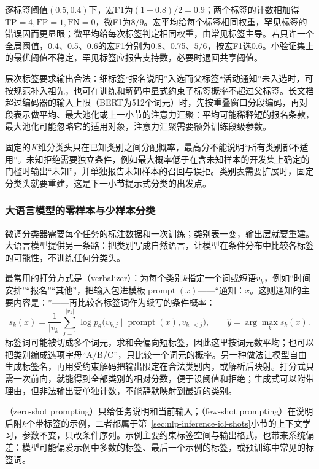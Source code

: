 逐标签阈值$(0.5,0.4)$下，宏F1为$(1+0.8)/2=0.9$；两个标签的计数相加得$\mathrm{TP}=4,\mathrm{FP}=1,\mathrm{FN}=0$，微F1为$8/9$。宏平均给每个标签相同权重，罕见标签的错误因而更显眼；微平均给每次标签判定相同权重，由常见标签主导。若只许一个全局阈值，0.4、0.5、0.6的宏F1分别为0.8、0.75、$5/6$，按宏F1选0.6。小验证集上的最优阈值不稳定，罕见标签应报告支持数，必要时退回共享阈值。

层次标签要求输出合法：细标签“报名说明”入选而父标签“活动通知”未入选时，可按规范补入祖先，也可在训练和解码中显式约束子标签概率不超过父标签。长文档超过编码器的输入上限（BERT为512个词元）时，先按重叠窗口分段编码，再对段表示做平均、最大池化或上一小节的注意力汇聚：平均可能稀释短的报名条款，最大池化可能忽略它的适用对象，注意力汇聚需要额外训练段级参数。

固定的$K$维分类头只在已知类别之间分配概率，最高分不能说明“所有类别都不适用”。未知拒绝需要独立条件，例如最大概率低于在含未知样本的开发集上确定的门槛时输出“未知”，并单独报告未知样本的召回与误拒。类别表需要扩展时，固定分类头就要重建，这是下一小节提示式分类的出发点。

\subsubsection{大语言模型的零样本与少样本分类}
\label{sec:nlp-classification-llm}

微调分类器需要每个任务的标注数据和一次训练；类别表一变，输出层就要重建。大语言模型提供另一条路：把类别写成自然语言，让模型在条件分布中比较各标签的可能性，不训练任何分类头。

最常用的打分方式是（verbalizer）：为每个类别$k$指定一个词或短语$v_k$，例如“时间安排”“报名”“其他”，把输入包进模板$\operatorname{prompt}(x)$——“通知：$x$。这则通知的主要内容是：”——再比较各标签词作为续写的条件概率\cite{nlp-schick2021pet}：
\begin{equation}
  \label{eq:nlp-classification-verbalizer}
  s_k(x)=\frac{1}{|v_k|}\sum_{j=1}^{|v_k|}\log p_{\bm\theta}\bigl(v_{k,j}\mid \operatorname{prompt}(x),v_{k,<j}\bigr),\qquad
  \hat y=\arg\max_k s_k(x).
\end{equation}
标签词可能被切成多个词元，求和会偏向短标签，因此这里按词元数平均；也可以把类别编成选项字母“A/B/C”，只比较一个词元的概率。另一种做法让模型自由生成标签名，再用受约束解码把输出限定在合法类别内，或解析后映射。打分式只需一次前向，就能得到全部类别的相对分数，便于设阈值和拒绝；生成式可以附带理由，但非法输出要单独计数，不能静默映射到最近的类别。

（zero-shot prompting）只给任务说明和当前输入；（few-shot prompting）在说明后附$k$个带标签的示例，二者都属于第~\ref{sec:nlp-inference-icl-shots}小节的上下文学习，参数不变，只改条件序列。示例主要约束标签空间与输出格式，也带来系统偏差：模型可能偏爱示例中多数的标签、最后一个示例的标签，或预训练中常见的标签词。


